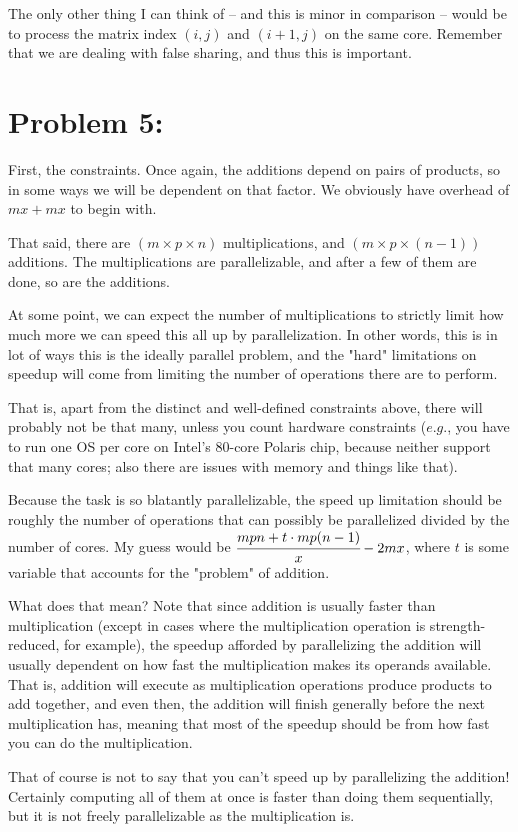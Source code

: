\documentclass[a4paper]{article}
\begin{document}
The only other thing I can think of -- and this is minor in comparison -- would be to process the matrix index $(i,j)$ and $(i+1,j)$ on the same core. Remember that we are dealing with false sharing, and thus this is important.

\section*{Problem 5:} First, the constraints. Once again, the additions depend on pairs of products, so in some ways we will be dependent on that factor. We obviously have overhead of $mx + mx$ to begin with.

That said, there are $(m \times p \times n)$ multiplications, and $(m \times p \times (n-1))$ additions. The multiplications are parallelizable, and after a few of them are done, so are the additions.

At some point, we can expect the number of multiplications to strictly limit how much more we can speed this all up by parallelization. In other words, this is in lot of ways this is the ideally parallel problem, and the "hard" limitations on speedup will come from limiting the number of operations there are to perform.

That is, apart from the distinct and well-defined constraints above, there will probably not be that many, unless you count hardware constraints ($\textit{e.g.}$, you have to run one OS per core on Intel's 80-core Polaris chip, because neither support that many cores; also there are issues with memory and things like that).

Because the task is so blatantly parallelizable, the speed up limitation should be roughly the number of operations that can possibly be parallelized divided by the number of cores. My guess would be $\cfrac{mpn + t \cdot mp(n-1)}{x} - 2mx$, where $t$ is some variable that accounts for the "problem" of addition.

What does that mean? Note that since addition is usually faster than multiplication (except in cases where the multiplication operation is strength-reduced, for example), the speedup afforded by parallelizing the addition will usually dependent on how fast the multiplication makes its operands available. That is, addition will execute as multiplication operations produce products to add together, and even then, the addition will finish generally before the next multiplication has, meaning that most of the speedup should be from how fast you can do the multiplication.

That of course is not to say that you can't speed up by parallelizing the addition! Certainly computing all of them at once is faster than doing them sequentially, but it is not freely parallelizable as the multiplication is.
\end{document}
